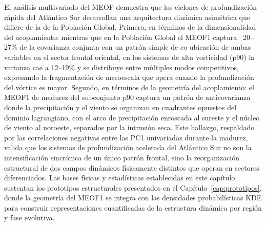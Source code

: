 El análisis multivariado del MEOF demuestra que los ciclones de profundización rápida del Atlántico Sur desarrollan una arquitectura dinámica asimétrica que difiere de la de la Población Global. 
Primero, en términos de la dimensionalidad del acoplamiento: mientras que en la Población Global el MEOF1 captura ~20--27\% de la covarianza conjunta con un patrón simple de co-ubicación de ambas variables en el sector frontal oriental, en los sistemas de alta vorticidad (p90) la varianza cae a 12--19\% y se distribuye entre múltiples modos competitivos, expresando la fragmentación de mesoescala que opera cuando la profundización del vórtice es mayor.
Segundo, en términos de la geometría del acoplamiento: el MEOF1 de madurez del subconjunto p90 captura un patrón de anticovarianza donde la precipitación y el viento se organizan en cuadrantes opuestos del dominio lagrangiano, con el arco de precipitación enroscada al sureste y el núcleo de viento al noroeste, separados por la intrusión seca.
Este hallazgo, respaldado por las correlaciones negativas entre las PC1 univariadas durante la madurez, valida que los sistemas de profundización acelerada del Atlántico Sur no son la intensificación sincrónica de un único patrón frontal, sino la reorganización estructural de dos campos dinámicos físicamente distintos que operan en sectores diferenciados.
Las bases físicas y estadísticas establecidas en este capítulo sustentan los prototipos estructurales presentados en el Capítulo~\ref{cap:prototipos}, donde la geometría del MEOF1 se integra con las densidades probabilísticas KDE para construir representaciones cuantificadas de la estructura dinámica por región y fase evolutiva.
